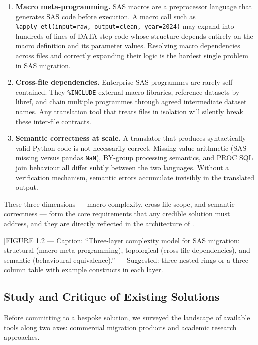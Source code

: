 \begin{enumerate}
  \item \textbf{Macro meta-programming.} SAS macros are a preprocessor language
    that generates SAS code before execution. A macro call such as
    \texttt{\%apply\_etl(input=raw, output=clean, year=2024)} may expand into
    hundreds of lines of DATA-step code whose structure depends entirely on the
    macro definition and its parameter values. Resolving macro dependencies
    across files and correctly expanding their logic is the hardest single
    problem in SAS migration.

  \item \textbf{Cross-file dependencies.} Enterprise SAS programmes are rarely
    self-contained. They \texttt{\%INCLUDE} external macro libraries, reference
    datasets by libref, and chain multiple programmes through agreed intermediate
    dataset names. Any translation tool that treats files in isolation will
    silently break these inter-file contracts.

  \item \textbf{Semantic correctness at scale.} A translator that produces
    syntactically valid Python code is not necessarily correct. Missing-value
    arithmetic (SAS missing versus pandas \texttt{NaN}), BY-group processing
    semantics, and PROC SQL join behaviour all differ subtly between the two
    languages. Without a verification mechanism, semantic errors accumulate
    invisibly in the translated output.
\end{enumerate}

These three dimensions --- macro complexity, cross-file scope, and semantic
correctness --- form the core requirements that any credible solution must
address, and they are directly reflected in the architecture of \codara{}.

[FIGURE 1.2 --- Caption: ``Three-layer complexity model for SAS migration:
structural (macro meta-programming), topological (cross-file dependencies),
and semantic (behavioural equivalence).'' --- Suggested: three nested rings
or a three-column table with example constructs in each layer.]

\subsection{Study and Critique of Existing Solutions}
\label{subsec:existing-solutions}

Before committing to a bespoke solution, we surveyed the landscape of available
tools along two axes: commercial migration products and academic
research approaches.


